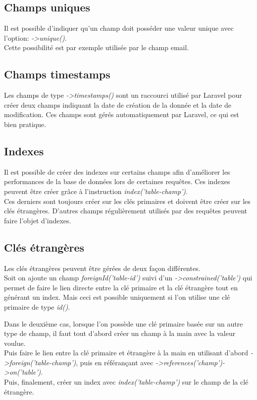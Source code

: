 \documentclass[
    iai, %
    il, %
]{heig-tb}
\begin{document}
\subsection{Champs uniques}
Il est possible d'indiquer qu'un champ doit posséder une valeur unique avec l'option: \emph{->unique()}.\\
Cette possibilité est par exemple utilisée par le champ email.

\subsection{Champs timestamps}
Les champs de type \emph{->timestamps()} sont un raccourci utilisé par Laravel pour créer deux champs indiquant la date de création de la donnée et la date de modification. Ces champs sont gérés automatiquement par Laravel, ce qui est bien pratique.

\subsection{Indexes}
Il est possible de créer des indexes sur certains champs afin d'améliorer les performances de la base de données lors de certaines requêtes. Ces indexes peuvent être créer grâce à l'instruction \emph{index('table-champ')}.\\
Ces derniers sont toujours créer sur les clés primaires et doivent être créer sur les clés étrangères. D'autres champs régulièrement utilisés par des requêtes peuvent faire l'objet d'indexes.

\subsection{Clés étrangères}
Les clés étrangères peuvent être gérées de deux façon différentes.\\
Soit on ajoute un champ \emph{foreignId('table-id')} suivi d'un \emph{->constrained('table')} qui permet de faire le lien directe entre la clé primaire et la clé étrangère tout en générant un index. Mais ceci est possible uniquement si l'on utilise une clé primaire de type \emph{id()}.

Dans le deuxième cas, lorsque l'on possède une clé primaire basée sur un autre type de champ, il faut tout d'abord créer un champ à la main avec la valeur voulue.\\
Puis faire le lien entre la clé primaire et étrangère à la main en utilisant d'abord \emph{->foreign('table-champ')}, puis en référançant avec \emph{->references('champ')->on('table')}.\\
Puis, finalement, créer un index avec \emph{index('table-champ')} sur le champ de la clé étrangère.
\end{document}
